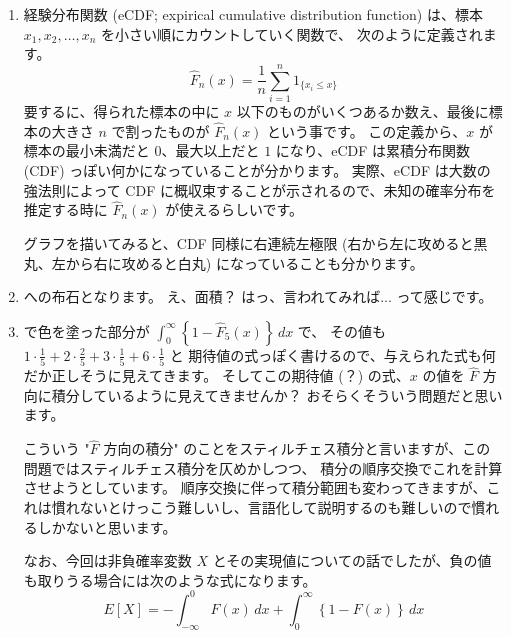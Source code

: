 \documentclass[./main.tex]{subfiles}
\begin{document}
    \begin{enumerate}
        \item 経験分布関数 (eCDF; expirical cumulative distribution function) は、標本 $x_1, x_2, \dots, x_n$ を小さい順にカウントしていく関数で、
        次のように定義されます。
        \begin{equation}
            \hat{F}_n (x)
                = \frac{1}{n} \sum_{i=1}^n 1_{ \{ x_i \leq x \} }
        \end{equation}
        要するに、得られた標本の中に $x$ 以下のものがいくつあるか数え、最後に標本の大きさ $n$ で割ったものが $\hat{F}_n (x)$ という事です。
        この定義から、$x$ が標本の最小未満だと $0$、最大以上だと $1$ になり、eCDF は累積分布関数 (CDF) っぽい何かになっていることが分かります。
        実際、eCDF は大数の強法則によって CDF に概収束することが示されるので、未知の確率分布を推定する時に $\hat{F}_n (x)$ が使えるらしいです。

        グラフを描いてみると、CDF 同様に右連続左極限 (右から左に攻めると黒丸、左から右に攻めると白丸) になっていることも分かります。


        \item \relax [3] への布石となります。
        え、面積？ はっ、言われてみれば... って感じです。
        
        \item \relax [2] で色を塗った部分が $\displaystyle \int_0^\infty \left\{ 1 - \hat{F}_5 (x) \right\} \, dx$ で、
        その値も $\displaystyle 1 \cdot \frac{1}{5} + 2 \cdot \frac{2}{5} + 3 \cdot \frac{1}{5} + 6 \cdot \frac{1}{5}$ と
        期待値の式っぽく書けるので、与えられた式も何だか正しそうに見えてきます。
        そしてこの期待値 (？) の式、$x$ の値を $\hat{F}$ 方向に積分しているように見えてきませんか？
        おそらくそういう問題だと思います。

        こういう "$\hat{F}$ 方向の積分" のことをスティルチェス積分と言いますが、この問題ではスティルチェス積分を仄めかしつつ、
        積分の順序交換でこれを計算させようとしています。
        順序交換に伴って積分範囲も変わってきますが、これは慣れないとけっこう難しいし、言語化して説明するのも難しいので慣れるしかないと思います。

        なお、今回は非負確率変数 $X$ とその実現値についての話でしたが、負の値も取りうる場合には次のような式になります。
        \begin{equation}
            E[X] 
                = - \int_{-\infty}^0 F(x) \,dx
                    + \int_0^\infty \left\{ 1 - F(x) \right\} \, dx
        \end{equation}



\end{enumerate}
\end{document}
